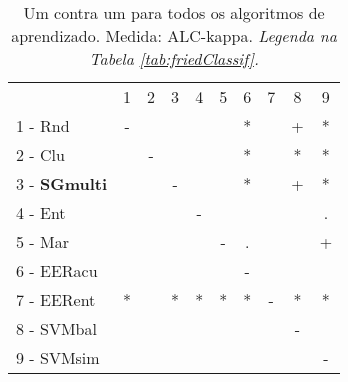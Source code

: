 \begin{table}[h]
\caption{Um contra um para todos os algoritmos de aprendizado. Medida: ALC-kappa. \textit{Legenda na Tabela \ref{tab:friedClassif}.}}
\begin{center}\begin{tabular}{lcc|cc|cc|cc|c}
 			& 1 & 2 & 3 & 4 & 5 & 6 & 7 & 8 & 9\\
1 - Rnd  	& - &   &   &   &   & * &   & + & * \\
2 - Clu  	&   & - &   &   &   & * &   & * & * \\ \hline
3 - \textbf{SGmulti}	&   &   & - &   &   & * &   & + & * \\
4 - Ent  	&   &   &   & - &   &   &   &   & . \\ \hline
5 - Mar  	&   &   &   &   & - & . &   &   & + \\
6 - EERacu	&   &   &   &   &   & - &   &   &   \\ \hline
7 - EERent	& * &   & * & * & * & * & - & * & * \\
8 - SVMbal	&   &   &   &   &   &   &   & - &   \\ \hline
9 - SVMsim	&   &   &   &   &   &   &   &   & - \\\end{tabular}
\label{stratsALCKappaFriedAllall}
\end{center}
\end{table}